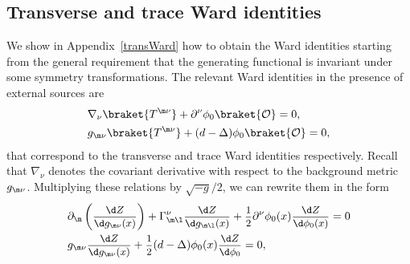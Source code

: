 \documentclass[a4paper,11pt,openright,twoside]{book}
\newcommand{\mO}{\mathcal{O}}
\let\n=\nu      \let\x=\xi     \let\p=\pi      \let\r=\rho
\let\G=\Gamma  \let\D=\Delta \let\Q=\Theta  \let\L=\Lambda
\newcommand{\sdfrac}[2]{\mbox{\small$\displaystyle\frac{#1}{#2}$}}
\newcommand{\appref}[1]{Appendix~\ref{#1}}		%
\numberwithin{equation}{section}
\begin{document}
{{%
\subsection{Transverse and trace Ward identities}\label{TraceTransverse}

We show in \appref{transWard} how to obtain the Ward identities starting from the general requirement that the generating functional is invariant under some symmetry transformations. The relevant Ward identities in the presence of external sources are
\begin{equation}
	\begin{split}
		&\nabla_\n\braket{T^{\m\n}}+\partial^\n\phi_0\braket{\mO}=0,\\
		&g_{\m\n}\braket{T^{\m\n}}+(d-\D)\phi_0\braket{\mO}=0,
	\end{split}\label{startpoint}
\end{equation}
that correspond to the transverse and trace Ward identities respectively. Recall that $\nabla_\n$ denotes the covariant derivative with respect to the background metric $g_{\m\n}$. Multiplying these relations by $\sqrt{-g}/2$, we can rewrite them in the form
\begin{align}
	&\partial_\m\left(\sdfrac{\d Z}{\d g_{\m\n}(x)}\right)+\G^\n_{\m\l}\sdfrac{\d Z}{\d g_{\m\l}(x)}+\sdfrac{1}{2}\partial^\n\phi_0(x)\sdfrac{\d Z}{\d \phi_0(x)}=0\label{transverse1}\\
	&g_{\m\n}\sdfrac{\d Z}{\d g_{\m\n}(x)}+\sdfrac{1}{2}(d-\D)\phi_0(x)\sdfrac{\d Z}{\d\phi_0}=0,\label{traceW}
\end{align}

}}
\end{document}
